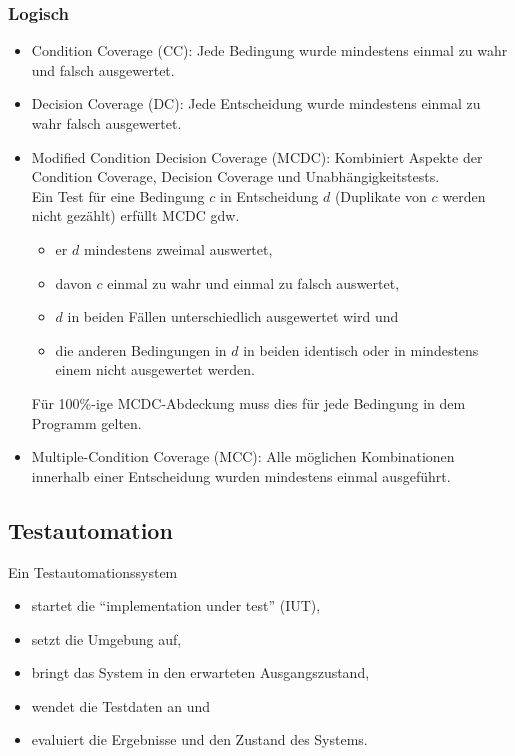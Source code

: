 \documentclass[ngerman,color=3b]{tuda_summary}
\begin{document}
\subsubsection{Logisch}\begin{itemize}
    \item Condition Coverage (CC): Jede Bedingung wurde mindestens einmal zu wahr und falsch ausgewertet.
    \item Decision Coverage (DC): Jede Entscheidung wurde mindestens einmal zu wahr falsch ausgewertet.
    \item Modified Condition Decision Coverage (MCDC): Kombiniert Aspekte der Condition Coverage, Decision Coverage und Unabhängigkeitstests.\\
          Ein Test für eine Bedingung $ c $ in Entscheidung $ d $ (Duplikate von $ c $ werden nicht gezählt) erfüllt MCDC gdw.
          \begin{itemize}
              \item er $ d $ mindestens zweimal auswertet,
              \item davon $ c $ einmal zu wahr und einmal zu falsch auswertet,
              \item $ d $ in beiden Fällen unterschiedlich ausgewertet wird und
              \item die anderen Bedingungen in $ d $ in beiden identisch oder in mindestens einem nicht ausgewertet werden.
          \end{itemize}
          Für 100\%-ige MCDC-Abdeckung muss dies für jede Bedingung in dem Programm gelten.
    \item Multiple-Condition Coverage (MCC): Alle möglichen Kombinationen innerhalb einer Entscheidung wurden mindestens einmal ausgeführt.
\end{itemize}
\clearpage
\subsection{Testautomation}
Ein Testautomationssystem
\begin{itemize}
    \item startet die \enquote{implementation under test} (IUT),
    \item setzt die Umgebung auf,
    \item bringt das System in den erwarteten Ausgangszustand,
    \item wendet die Testdaten an und
    \item evaluiert die Ergebnisse und den Zustand des Systems.
\end{itemize}
\end{document}
